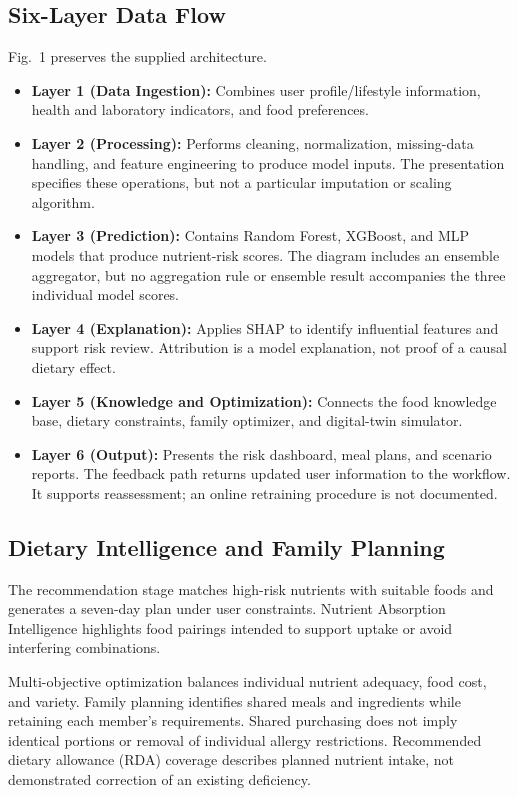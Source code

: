 \documentclass[conference]{IEEEtran}
\begin{document}
\subsection{Six-Layer Data Flow}
Fig.~1 preserves the supplied architecture. 
\begin{itemize}
    \item \textbf{Layer 1 (Data Ingestion):} Combines user profile/lifestyle information, health and laboratory indicators, and food preferences.
    \item \textbf{Layer 2 (Processing):} Performs cleaning, normalization, missing-data handling, and feature engineering to produce model inputs. The presentation specifies these operations, but not a particular imputation or scaling algorithm.
    \item \textbf{Layer 3 (Prediction):} Contains Random Forest, XGBoost, and MLP models that produce nutrient-risk scores. The diagram includes an ensemble aggregator, but no aggregation rule or ensemble result accompanies the three individual model scores.
    \item \textbf{Layer 4 (Explanation):} Applies SHAP to identify influential features and support risk review. Attribution is a model explanation, not proof of a causal dietary effect.
    \item \textbf{Layer 5 (Knowledge and Optimization):} Connects the food knowledge base, dietary constraints, family optimizer, and digital-twin simulator.
    \item \textbf{Layer 6 (Output):} Presents the risk dashboard, meal plans, and scenario reports. The feedback path returns updated user information to the workflow. It supports reassessment; an online retraining procedure is not documented.
\end{itemize}

\subsection{Dietary Intelligence and Family Planning}
The recommendation stage matches high-risk nutrients with suitable foods and generates a seven-day plan under user constraints. Nutrient Absorption Intelligence highlights food pairings intended to support uptake or avoid interfering combinations.

Multi-objective optimization balances individual nutrient adequacy, food cost, and variety. Family planning identifies shared meals and ingredients while retaining each member's requirements. Shared purchasing does not imply identical portions or removal of individual allergy restrictions. Recommended dietary allowance (RDA) coverage describes planned nutrient intake, not demonstrated correction of an existing deficiency.
\end{document}
